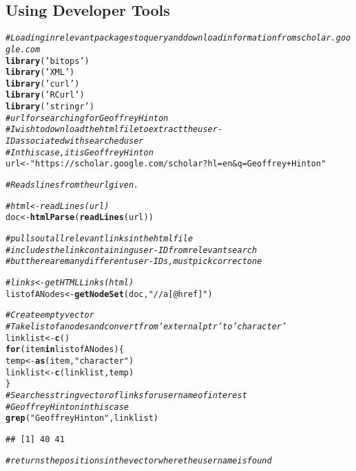 \documentclass{article}\usepackage[]{graphicx}\usepackage[]{color}
\makeatletter
\newcommand{\hlstr}[1]{\textcolor[rgb]{0.192,0.494,0.8}{#1}}%
\newcommand{\hlcom}[1]{\textcolor[rgb]{0.678,0.584,0.686}{\textit{#1}}}%
\newcommand{\hlstd}[1]{\textcolor[rgb]{0.345,0.345,0.345}{#1}}%
\newcommand{\hlkwa}[1]{\textcolor[rgb]{0.161,0.373,0.58}{\textbf{#1}}}%
\newcommand{\hlkwb}[1]{\textcolor[rgb]{0.69,0.353,0.396}{#1}}%
\newcommand{\hlkwd}[1]{\textcolor[rgb]{0.737,0.353,0.396}{\textbf{#1}}}%
\newenvironment{kframe}{%
 \def\at@end@of@kframe{}%
 \ifinner\ifhmode%
  \def\at@end@of@kframe{\end{minipage}}%
  \begin{minipage}{\columnwidth}%
 \fi\fi%
 \def\FrameCommand##1{\hskip\@totalleftmargin \hskip-\fboxsep
 \colorbox{shadecolor}{##1}\hskip-\fboxsep
     \hskip-\linewidth \hskip-\@totalleftmargin \hskip\columnwidth}%
 \MakeFramed {\advance\hsize-\width
   \@totalleftmargin\z@ \linewidth\hsize
   \@setminipage}}%
 {\par\unskip\endMakeFramed%
 \at@end@of@kframe}
\newenvironment{knitrout}{}{} %
\makeatother
\begin{document}
\subsection{Using Developer Tools}
\begin{knitrout}
\color{fgcolor}\begin{kframe}
\begin{alltt}
\hlcom{#Loading in relevant packages to query and download information from scholar.google.com}
\hlkwd{library}\hlstd{(}\hlstr{'bitops'}\hlstd{)}
\hlkwd{library}\hlstd{(}\hlstr{'XML'}\hlstd{)}
\hlkwd{library}\hlstd{(}\hlstr{'curl'}\hlstd{)}
\hlkwd{library}\hlstd{(}\hlstr{'RCurl'}\hlstd{)}
\hlkwd{library}\hlstd{(}\hlstr{'stringr'}\hlstd{)}
\hlcom{#url for searching for Geoffrey Hinton}
\hlcom{#I wish to download the html file to extract the user-ID associated with searched user}
\hlcom{#In this case, it is Geoffrey Hinton}
\hlstd{url}\hlkwb{<-}\hlstr{"https://scholar.google.com/scholar?hl=en&q=Geoffrey+Hinton"}

\hlcom{#Reads lines from the url given.}

\hlcom{#html<-readLines(url)}
\hlstd{doc}\hlkwb{<-}\hlkwd{htmlParse}\hlstd{(}\hlkwd{readLines}\hlstd{(url))}
\end{alltt}


{\ttfamily\noindent\color{warningcolor}{\#\# Warning in readLines(url): incomplete final line found on 'https://scholar.google.com/scholar?hl=en\&q=Geoffrey+Hinton'}}\begin{alltt}
\hlcom{#pulls out all relevant links in the html file}
\hlcom{#includes the link containing user-ID from relevant search}
\hlcom{#but there are many different user-IDs, must pick correct one}

\hlcom{#links<-getHTMLLinks(html)}
\hlstd{listofANodes}\hlkwb{<-}\hlkwd{getNodeSet}\hlstd{(doc,} \hlstr{"//a[@href]"}\hlstd{)}

\hlcom{#Create empty vector}
\hlcom{#Take list of a nodes and convert from 'externalptr' to 'character'}
\hlstd{linklist}\hlkwb{<-}\hlkwd{c}\hlstd{()}
\hlkwa{for} \hlstd{(item} \hlkwa{in} \hlstd{listofANodes) \{}
  \hlstd{temp}\hlkwb{<-}\hlkwd{as}\hlstd{(item,} \hlstr{"character"}\hlstd{)}
  \hlstd{linklist}\hlkwb{<-}\hlkwd{c}\hlstd{(linklist, temp)}
\hlstd{\}}
\hlcom{#Searches string vector of links for user name of interest}
\hlcom{#Geoffrey Hinton in this case}
\hlkwd{grep}\hlstd{(}\hlstr{"Geoffrey Hinton"}\hlstd{, linklist)}
\end{alltt}
\begin{verbatim}
## [1] 40 41
\end{verbatim}
\begin{alltt}
\hlcom{#returns the positions in the vector where the username is found}


\end{alltt}
\end{kframe}
\end{knitrout}
\end{document}
